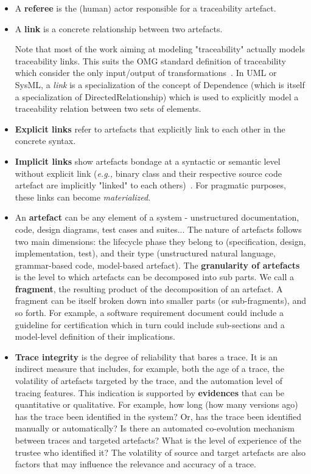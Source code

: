 \begin{itemize}
	\item A \textbf{referee} is the (human) actor responsible for a traceability artefact.
	
	\item A \textbf{link} is a concrete relationship between two artefacts. 
	
	Note that most of the work aiming at modeling "traceability" actually models traceability links. This suits the OMG standard definition of traceability which consider the only input/output of transformations~\cite{winkler2010-survey-traceability-and-MDE}. 
	In UML or SysML, a \textit{link} is a specialization of the concept of Dependence (which is itself a specialization of DirectedRelationship) which is used to explicitly model a traceability relation between two sets of elements.
	
	\item \textbf{Explicit links} refer to artefacts that explicitly link to each other in the concrete syntax. 

	\item \textbf{Implicit links} show artefacts bondage at a syntactic or semantic level without explicit link (\textit{e.g.,} binary class and their respective source code artefact are implicitly "linked" to each others)~\cite{paige2010-MDE-Traceability-classifications}. For pragmatic purposes, these links can become \textit{materialized}.
	
	\item An \textbf{artefact} can be any element of a system - \eg unstructured documentation, code, design diagrams, test cases and suites... The nature of artefacts follows two main dimensions: the lifecycle phase they belong to (\eg specification, design, implementation, test), and their type (\eg unstructured natural language, grammar-based code, model-based artefact). The \textbf{granularity of artefacts} is the level to which artefacts can be decomposed into sub parts. We call a \textbf{fragment}, the resulting product of the decomposition of an artefact. A fragment can be itself broken down into smaller parts (or sub-fragments), and so forth. For example, a software requirement document could include a guideline for certification which in turn could include sub-sections and a model-level definition of their implications.
	
	\item \textbf{Trace integrity} is the degree of reliability that bares a trace. It is an indirect measure that includes, for example, both the age of a trace, the volatility of artefacts targeted by the trace, and the automation level of tracing features. This indication is supported by \textbf{evidences} that can be quantitative or qualitative. For example, how long (how many versions ago) has the trace been identified in the system? Or, has the trace been identified manually or automatically? Is there an automated co-evolution mechanism between traces and targeted artefacts? What is the level of experience of the trustee who identified it? 
	The volatility of source and target artefacts are also factors that may influence the relevance and accuracy of a trace.
	

\end{itemize}
